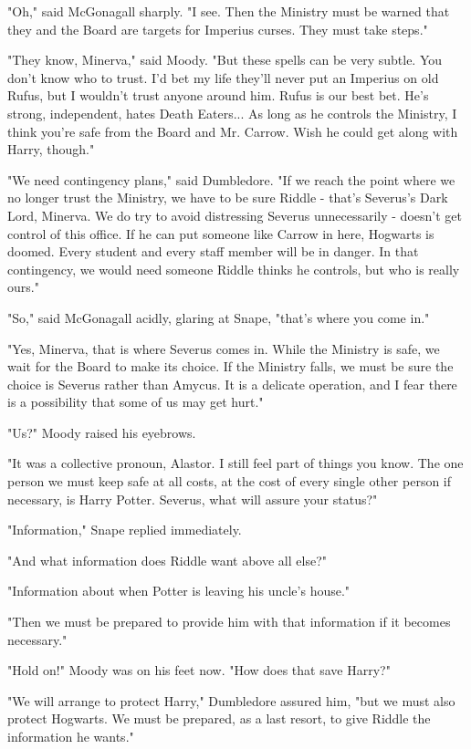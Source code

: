 \documentclass[a4paper,11pt]{article}
\begin{document}
"Oh," said McGonagall sharply. "I see. Then the Ministry must be warned that they and the Board are targets for Imperius curses. They must take steps."

"They know, Minerva," said Moody. "But these spells can be very subtle. You don't know who to trust. I'd bet my life they'll never put an Imperius on old Rufus, but I wouldn't trust anyone around him. Rufus is our best bet. He's strong, independent, hates Death Eaters... As long as he controls the Ministry, I think you're safe from the Board and Mr. Carrow. Wish he could get along with Harry, though."

"We need contingency plans," said Dumbledore. "If we reach the point where we no longer trust the Ministry, we have to be sure Riddle - that's Severus's Dark Lord, Minerva. We do try to avoid distressing Severus unnecessarily - doesn't get control of this office. If he can put someone like Carrow in here, Hogwarts is doomed. Every student and every staff member will be in danger. In that contingency, we would need someone Riddle thinks he controls, but who is really ours."

"So," said McGonagall acidly, glaring at Snape, "that's where you come in."

"Yes, Minerva, that is where Severus comes in. While the Ministry is safe, we wait for the Board to make its choice. If the Ministry falls, we must be sure the choice is Severus rather than Amycus. It is a delicate operation, and I fear there is a possibility that some of us may get hurt."

"Us?" Moody raised his eyebrows.

"It was a collective pronoun, Alastor. I still feel part of things you know. The one person we must keep safe at all costs, at the cost of every single other person if necessary, is Harry Potter. Severus, what will assure your status?"

"Information," Snape replied immediately.

"And what information does Riddle want above all else?"

"Information about when Potter is leaving his uncle's house."

"Then we must be prepared to provide him with that information if it becomes necessary."

"Hold on!" Moody was on his feet now. "How does that save Harry?"

"We will arrange to protect Harry," Dumbledore assured him, "but we must also protect Hogwarts. We must be prepared, as a last resort, to give Riddle the information he wants."
\end{document}
